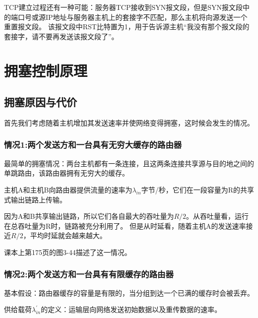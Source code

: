 \documentclass[a4paper,left=2.5cm,right=2.5cm,11pt]{article}
\begin{document}
	TCP建立过程还有一种可能：服务器TCP接收到SYN报文段，但是SYN报文段中的端口号或源IP地址与服务器主机上的套接字不匹配，那么主机将向源发送一个重置报文段。
	该报文段中RST比特置为1，用于告诉源主机“我没有那个报文段的套接字，请不要再发送该报文段了”。

\section{拥塞控制原理}
\subsection{拥塞原因与代价}
	首先我们考虑随着主机增加其发送速率并使网络变得拥塞，这时候会发生的情况。

\subsubsection{情况1:两个发送方和一台具有无穷大缓存的路由器}
	最简单的拥塞情况：两台主机都有一条连接，且这两条连接共享源与目的地之间的单跳路由，该路由器拥有无穷大的缓存。\par

	主机A和主机B向路由器提供流量的速率为$\lambda_{in}$字节/秒，它们在一段容量为R的共享式输出链路上传输。\par

	因为A和B共享输出链路，所以它们各自最大的吞吐量为$R/2$。从吞吐量看，运行在总吞吐量为R时，链路被充分利用了。
	但是从时延看，随着主机A的发送速率接近$R/2$，平均时延就会越来越大。\par

	课本上第175页的图3-44描述了这一情况。

\subsubsection{情况2:两个发送方和一台具有有限缓存的路由器}
	基本假设：路由器缓存的容量是有限的，当分组到达一个已满的缓存时会被丢弃。\par

	供给载荷$\lambda^{'}_{in}$的定义：运输层向网络发送初始数据以及重传数据的速率。\par
\end{document}
